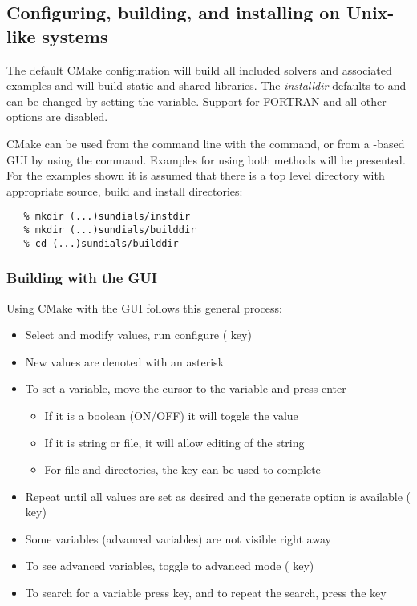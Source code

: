 \subsection{Configuring, building, and installing on Unix-like systems}

The default CMake configuration will build all included solvers and
associated examples and will build static and shared libraries. The
{\em installdir} defaults to  and can be changed by
setting the  variable.  Support for FORTRAN
and all other options are disabled.

CMake can be used from the command line with the  command, or from a -based GUI
by using the  command. Examples for using both methods will be presented.
For the examples shown it is assumed that there is a top level {\sundials} directory
with appropriate source, build and install directories:

\begin{verbatim}
   % mkdir (...)sundials/instdir
   % mkdir (...)sundials/builddir
   % cd (...)sundials/builddir
\end{verbatim}

\subsubsection*{Building with the GUI}

Using CMake with the GUI follows this general process:  
\begin{itemize}
\item Select and modify values, run configure ( key)
\item New values are denoted with an asterisk
\item To set a variable, move the cursor to the variable and press enter
  \begin{itemize}
  \item If it is a boolean (ON/OFF) it will toggle the value
  \item If it is string or file, it will allow editing of the string
  \item For file and directories, the  key can be used to complete 
  \end{itemize}
\item Repeat until all values are set as desired and the generate option is available ( key)
\item Some variables (advanced variables) are not visible right away
\item To see advanced variables, toggle to advanced mode ( key)
\item To search for a variable press \id{/} key, and to repeat the search, press the
 key
\end{itemize}

